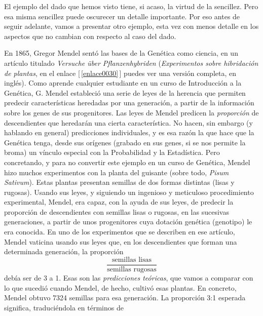 El ejemplo del dado que hemos visto tiene, si acaso, la virtud de la sencillez. Pero esa misma
sencillez puede oscurecer un detalle importante. Por eso antes de seguir adelante, vamos a
presentar otro ejemplo, esta vez con menos detalle en los aspectos que no cambian con respecto al
caso del dado.
\begin{ejemplo}
\label{cap12:ejem:Mendel}
    En 1865, Gregor Mendel sentó las bases de la Genética como ciencia, en un artículo titulado {\em Versuche über Pflanzenhybriden} ({\em Experimentos sobre hibridación de plantas}, en el enlace [\,\ref{enlace0030}\,]\label{enlace0030a} puedes ver una versión completa, en inglés). Como aprende cualquier estudiante en un curso de Introducción a la Genética, G. Mendel estableció una serie de leyes de la herencia que permiten predecir características heredadas por una generación, a partir de la información sobre los genes de sus progenitores. Las leyes de Mendel predicen la {\em proporción} de descendientes que heredarán una cierta característica. No hacen, sin embargo (y hablando en general) predicciones individuales, y es esa razón la que hace que la Genética tenga, desde sus orígenes (grabado en sus genes, si se nos permite la broma) un vínculo especial con la Probabilidad y
    la  Estadística.
Pero concretando, y para no convertir este ejemplo en un curso de Genética, Mendel hizo muchos
experimentos con la planta del guisante (sobre todo, {\em Pisum Sativum}). Estas plantas presentan
semillas de dos formas distintas (lisas y rugosas). Usando sus leyes, y siguiendo un ingenioso y
meticuloso procedimiento experimental, Mendel, era capaz, con la ayuda de sus leyes, de predecir la
proporción de descendientes con semillas lisas o rugosas, en las sucesivas generaciones, a partir
de unos progenitores cuya dotación genética (genotipo) le era conocida. En uno de los experimentos
que se describen en ese artículo, Mendel vaticina usando sus leyes que, en los descendientes que
forman una determinada generación, la proporción
    \[\dfrac{\mbox{semillas lisas}}{\mbox{semillas rugosas}}\]
debía ser de 3 a 1. Esas son las {\em predicciones teóricas}, que vamos a comparar con lo que
sucedió cuando Mendel, de hecho, cultivó esas plantas. En concreto, Mendel obtuvo 7324 semillas
para esa generación. La proporción 3:1 esperada significa, traduciéndola en términos de

\end{ejemplo}
